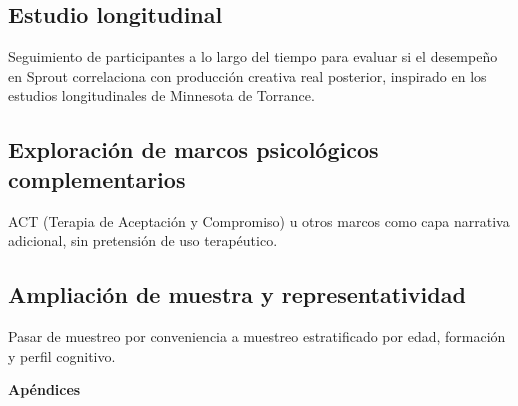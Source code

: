 \documentclass[12pt,twoside,titlepage]{report}
\newcommand\blankpage{%
    \newpage
    \null
    \thispagestyle{empty}%
    \newpage}
\begin{document}
\subsection{Estudio longitudinal}

Seguimiento de participantes a lo largo del tiempo para evaluar si el desempeño en Sprout correlaciona con producción creativa real posterior, inspirado en los estudios longitudinales de Minnesota de Torrance.

\subsection{Exploración de marcos psicológicos complementarios}

ACT (Terapia de Aceptación y Compromiso) u otros marcos como capa narrativa adicional, sin pretensión de uso terapéutico.

\subsection{Ampliación de muestra y representatividad}

Pasar de muestreo por conveniencia a muestreo estratificado por edad, formación y perfil cognitivo.


{}

\footnotesize{
%


}



\raggedbottom
\afterpage{\blankpage}

\newpage





\appendix

{}

\mbox{}
\vfill
\begin{center}
\begin{Huge}
\textbf{Apéndices}
\end{Huge}
\end{center}
\vfill
\mbox{}
\thispagestyle{empty}

\newpage
\mbox{}
\thispagestyle{empty}
\newpage
\end{document}
